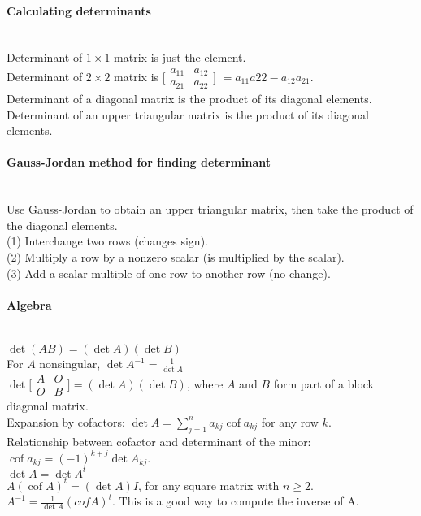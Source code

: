 \documentclass[10pt]{article}
\DeclareMathOperator{\cof}{cof}
\begin{document}
\paragraph{Calculating determinants}\ \\
Determinant of $1 \times 1$ matrix is just the element.\\
Determinant of $2 \times 2$ matrix is $\bigl[ \begin{smallmatrix} a_{11} & a_{12} \\ a_{21} & a_{22} \end{smallmatrix} \bigr]$
$ = a_{11}a{22} - a_{12}a_{21}$.\\
Determinant of a diagonal matrix is the product of its diagonal elements.\\
Determinant of an upper triangular matrix is the product of its diagonal elements.

\paragraph{Gauss-Jordan method for finding determinant}\ \\
Use Gauss-Jordan to obtain an upper triangular matrix, then take the product of the diagonal elements.\\
(1) Interchange two rows (changes sign).\\
(2) Multiply a row by a nonzero scalar (is multiplied by the scalar).\\
(3) Add a scalar multiple of one row to another row (no change).

\paragraph{Algebra}\ \\
$\det (AB) = (\det A)(\det B)$\\
For $A$ nonsingular, $\det A^{-1} = \frac{1}{\det A}$\\
$\det \bigl[ \begin{smallmatrix} A & O \\ O & B \end{smallmatrix} \bigr] = (\det A)(\det B)$, where $A$ and $B$ 
form part of a block diagonal matrix.\\
Expansion by cofactors: $\det A = \sum_{j=1}^n a_{kj} \cof a_{kj}$ for any row $k$.\\
Relationship between cofactor and determinant of the minor: $\cof a_{kj} = (-1)^{k+j} \det A_{kj}$.\\
$\det A = \det A^t$\\
$A(\cof A)^t = (\det A) I$, for any square matrix with $n \geq 2$.\\
$A^{-1} = \frac{1}{\det A} (cof A)^t$.  This is a good way to compute the inverse of A.
\end{document}
